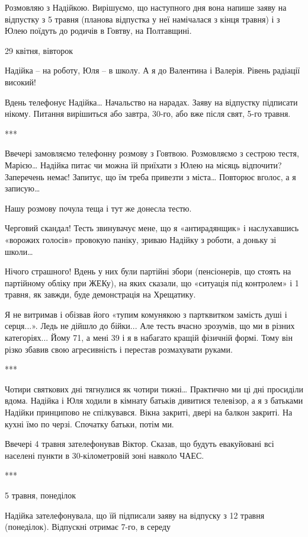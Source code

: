 Розмовляю з Надійкою. Вирішуємо, що наступного дня вона напише заяву на
відпустку з 5 травня (планова відпустка у неї намічалася з кінця травня) і з
Юлею поїдуть до родичів в Говтву, на Полтавщині. 

29 квітня, вівторок

Надійка – на роботу, Юля – в школу. А я до Валентина і Валерія. Рівень радіації
високий!

Вдень телефонує Надійка… Начальство на нарадах. Заяву на відпустку підписати
нікому. Питання вирішиться або завтра, 30-го, або вже після свят, 5-го травня. 

***

Ввечері замовляємо телефонну розмову з Говтвою. Розмовляємо з сестрою тестя,
Марією… Надійка питає чи можна їй приїхати з Юлею на місяць відпочити?
Заперечень немає! Запитує, що їм треба привезти з міста… Повторює вголос, а я
записую…

Нашу розмову почула теща і тут же донесла тестю. 

Черговий скандал! Тесть звинувачує мене, що я «антирадянщик» і наслухавшись
«ворожих голосів» провокую паніку, зриваю Надійку з роботи, а доньку зі школи… 

Нічого страшного! Вдень у них були партійні збори (пенсіонерів, що стоять на
партійному обліку при ЖЕКу), на яких сказали, що «ситуація під контролем» і 1
травня, як завжди, буде демонстрація на Хрещатику.

Я не витримав і обізвав його «тупим комунякою з партквитком замість душі і
серця...». Ледь не дійшло до бійки... Але тесть вчасно зрозумів, що ми в різних
категоріях... Йому 71, а мені 39 і я в набагато кращій фізичній формі. Тому він
різко збавив свою агресивність і перестав розмахувати руками. 

***

Чотири святкових дні тягнулися як чотири тижні… Практично ми ці дні просиділи
вдома. Надійка і Юля ходили в кімнату батьків дивитися телевізор, а я з
батьками Надійки принципово не спілкувався. Вікна закриті, двері на балкон
закриті. На кухні їмо по черзі. Спочатку батьки, потім ми.

Ввечері 4 травня зателефонував Віктор. Сказав, що будуть евакуйовані всі
населені пункти в 30-кілометровій зоні навколо ЧАЕС.

***

5 травня, понеділок

Надійка зателефонувала, що їй підписали заяву на відпуску з 12 травня
(понеділок). Відпускні отримає 7-го, в середу

